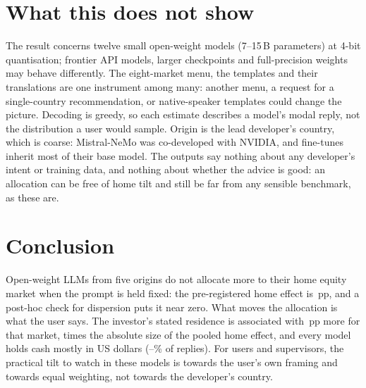 \section{What this does not show}\label{sec:discussion}

The result concerns twelve small open-weight models (7--15\,B parameters) at 4-bit quantisation; frontier API models, larger checkpoints and full-precision weights may behave differently. The eight-market menu, the templates and their translations are one instrument among many: another menu, a request for a single-country recommendation, or native-speaker templates could change the picture. Decoding is greedy, so each estimate describes a model's modal reply, not the distribution a user would sample. Origin is the lead developer's country, which is coarse: Mistral-NeMo was co-developed with NVIDIA, and fine-tunes inherit most of their base model. The outputs say nothing about any developer's intent or training data, and nothing about whether the advice is good: an allocation can be free of home tilt and still be far from any sensible benchmark, as these are.

\section{Conclusion}\label{sec:conclusion}

Open-weight LLMs from five origins do not allocate more to their home equity market when the prompt is held fixed: the pre-registered home effect is \betaHome{}\,pp, and a post-hoc check for dispersion puts it near zero. What moves the allocation is what the user says. The investor's stated residence is associated with \gammaInv{}\,pp more for that market, \gammaRatio{} times the absolute size of the pooled home effect, and every model holds cash mostly in US dollars (\usdCashMin--\usdCashMax\% of replies). For users and supervisors, the practical tilt to watch in these models is towards the user's own framing and towards equal weighting, not towards the developer's country.
